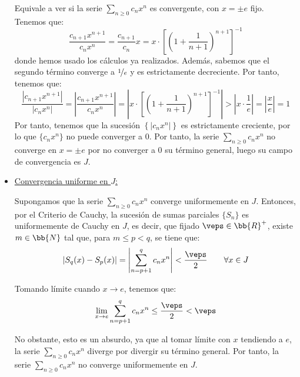 \begin{ejercicio}
\begin{itemize}
        Equivale a ver si la serie
        $\sum\limits_{n\geq 0}c_nx^n$ es convergente, con $x=\pm e$ fijo. Tenemos que:
        \begin{equation*}
            \frac{c_{n+1}x^{n+1}}{c_nx^n} = \frac{c_{n+1}}{c_n}x = x\cdot \left[\left(1+\frac{1}{n+1}\right)^{n+1}\right]^{-1}
        \end{equation*}
        donde hemos usado los cálculos ya realizados. Además, sabemos que el segundo término converge a $\nicefrac{1}{e}$ y es estrictamente
        decreciente. Por tanto, tenemos que:
        \begin{equation*}
            \frac{\left|c_{n+1}x^{n+1}\right|}{\left|c_nx^n\right|}
            = \left|\frac{c_{n+1}x^{n+1}}{c_nx^n}\right|
            = \left|x\cdot \left[\left(1+\frac{1}{n+1}\right)^{n+1}\right]^{-1}\right|
            > \left|x\cdot \frac{1}{e}\right| = \left|\frac{x}{e}\right|=1
        \end{equation*}
        Por tanto, tenemos que la sucesión $\left\{|c_nx^n|\right\}$ es estrictamente creciente, por lo que $\{c_nx^n\}$ no puede
        converger a $0$.
        Por tanto, la serie $\sum\limits_{n\geq 0}c_nx^n$ no converge en $x=\pm e$ por no converger a $0$ su término general, luego su campo
        de convergencia es $J$.
        
        
        \item \ul{Convergencia uniforme en $J$:}
        
        Supongamos que la serie $\sum\limits_{n\geq 0}c_nx^n$ converge uniformemente en $J$. Entonces, por el Criterio de Cauchy, la sucesión de sumas parciales
        $\{S_n\}$ es uniformemente de Cauchy en $J$, es decir, que fijado $\veps\in \bb{R}^+$, existe $m\in \bb{N}$ tal que, para $m\leq p < q$, se tiene que:
        \begin{equation*}
            |S_q(x) - S_p(x)| = \left|\sum_{n=p+1}^q c_nx^n\right| < \frac{\veps}{2} \qquad \forall x\in J
        \end{equation*}

        Tomando límite cuando $x\to e$, tenemos que:
        \begin{equation*}
            \lim_{x\to e}\sum_{n=p+1}^q c_nx^n \leq \frac{\veps}{2} < \veps
        \end{equation*}

        No obstante, esto es un absurdo, ya que al tomar límite con $x$ tendiendo a $e$, la serie $\sum\limits_{n\geq 0}c_nx^n$ diverge por divergir
        su término general. Por tanto, la serie $\sum\limits_{n\geq 0}c_nx^n$ no converge uniformemente en $J$.
    \end{itemize}
\end{ejercicio}


